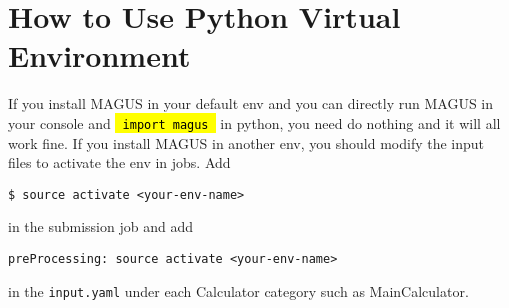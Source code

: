 \documentclass[12pt,oneside]{book}
\newcommand{\code}[1]{
  \begingroup
  \sethlcolor{Seashell}
  {\hl{\texttt{~#1~}}}
  \endgroup
}
\newcommand{\file}[1]{\texttt{#1}}
\begin{document}
\section{How to Use Python Virtual Environment}\label{sec: virtual environment}
If you install MAGUS in your default env and you can directly run MAGUS in your console and \code{import magus} in python, you need do nothing and it will all work fine. If you install MAGUS in another env, you should modify the input files to activate the env in jobs. Add
\begin{tcolorbox}
    \begin{verbatim}
$ source activate <your-env-name>
    \end{verbatim}
\end{tcolorbox}
in the submission job and add
\begin{tcolorbox}
    \begin{verbatim}
preProcessing: source activate <your-env-name>
    \end{verbatim}
\end{tcolorbox}
in the \file{input.yaml} under each Calculator category such as MainCalculator.
\end{document}
